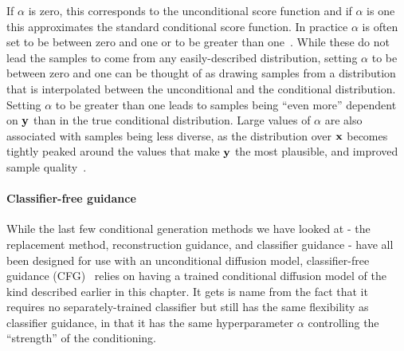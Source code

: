 If $\alpha$ is zero, this corresponds to the unconditional score function and if $\alpha$ is one this approximates the standard conditional score function. In practice $\alpha$ is often set to be between zero and one or to be greater than one~\citep{ho2022classifier,meng2022distillation}. While these do not lead the samples to come from any easily-described distribution, setting $\alpha$ to be between zero and one can be thought of as drawing samples from a distribution that is interpolated between the unconditional and the conditional distribution. Setting $\alpha$ to be greater than one leads to samples being ``even more'' dependent on ${\mathbf{y}}$ than in the true conditional distribution. Large values of $\alpha$ are also associated with samples being less diverse, as the distribution over ${\mathbf{x}}$ becomes tightly peaked around the values that make ${\mathbf{y}}$ the most plausible, and improved sample quality~\citep{ho2022classifier}.

\paragraph{Classifier-free guidance}
While the last few conditional generation methods we have looked at - the replacement method, reconstruction guidance, and classifier guidance - have all been designed for use with an unconditional diffusion model, classifier-free guidance (CFG)~\citep{ho2022classifier} relies on having a trained conditional diffusion model of the kind described earlier in this chapter. It gets is name from the fact that it requires no separately-trained classifier but still has the same flexibility as classifier guidance, in that it has the same hyperparameter $\alpha$ controlling the ``strength'' of the conditioning.

